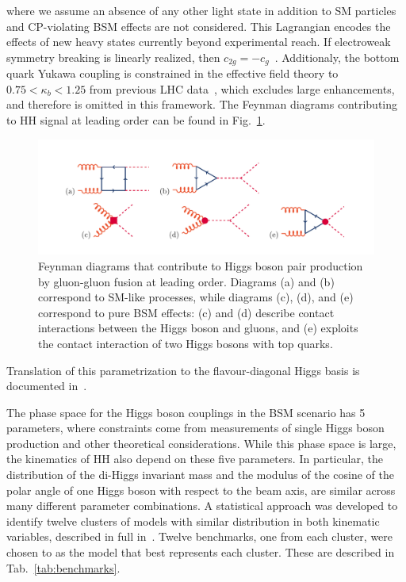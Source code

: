 where we assume an absence of any other light state in addition to SM particles and CP-violating BSM effects are not considered. This Lagrangian encodes the effects of new heavy states currently beyond experimental reach. If electroweak symmetry breaking is linearly realized, then $c_{2g} = - c_g$~\cite{Giudice:2007fh,BUCHMULLER1986621}. Additionaly, the bottom quark Yukawa coupling is constrained in the effective field theory to $0.75<\kappa_b<1.25$ from previous LHC data~\cite{Corbett:2015ksa}, which excludes large enhancements, and therefore is omitted in this framework. The Feynman diagrams contributing to HH signal at leading order can be found in Fig.~\ref{fig:dia}.

\begin{figure}[h]
\centering
\includegraphics[scale=0.85]{F2/translation.pdf}
\caption{\small Feynman diagrams that contribute to Higgs boson pair production by gluon-gluon fusion at leading order. Diagrams (a) and (b) correspond to SM-like processes, while diagrams (c), (d), and (e) correspond to pure BSM effects: (c) and (d) describe contact interactions between the Higgs boson and gluons, and (e) exploits the contact interaction of two Higgs bosons with top quarks.   \label{fig:dia}}
\end{figure}
Translation of this parametrization to the flavour-diagonal Higgs basis is documented in~\cite{Falkowski:2015fla}.

The phase space for the Higgs boson couplings in the BSM scenario has 5 parameters, where constraints come from measurements of single Higgs boson production and other theoretical considerations. While this phase space is large, the kinematics of HH also depend on these five parameters. In particular, the distribution of the di-Higgs invariant mass and the modulus of the cosine of the polar angle of one Higgs boson with respect to the beam axis, are similar across many different parameter combinations. A statistical approach was developed to identify twelve clusters of models with similar distribution in both kinematic variables, described in full in~\cite{Carvalho2016}. Twelve benchmarks, one from each cluster, were chosen to as the model that best represents each cluster. These are described in Tab.~\ref{tab:benchmarks}.

